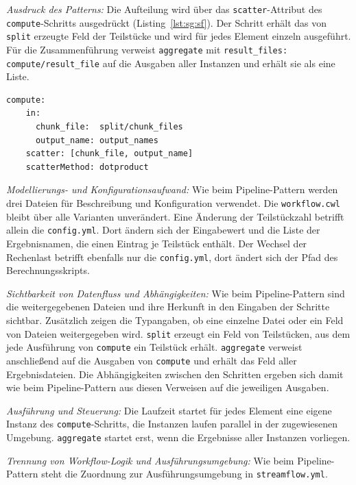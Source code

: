 \emph{Ausdruck des Patterns:} Die Aufteilung wird über das
\texttt{scatter}-Attribut des \texttt{compute}-Schritts ausgedrückt (Listing~\ref{lst:sg:sf}).
Der Schritt erhält das von \texttt{split} erzeugte Feld der
Teilstücke und wird für jedes Element einzeln ausgeführt.
Für die Zusammenführung verweist \texttt{aggregate} mit
\texttt{result\_files: compute/result\_file} auf die Ausgaben aller
Instanzen und erhält sie als eine Liste.

\begin{lstlisting}[caption={Fan-out über scatter am compute-Schritt (StreamFlow, Scatter-Gather)},label={lst:sg:sf}]
  compute:
    in:
      chunk_file:  split/chunk_files
      output_name: output_names
    scatter: [chunk_file, output_name]
    scatterMethod: dotproduct
\end{lstlisting}

\emph{Modellierungs- und Konfigurationsaufwand:} Wie beim
Pipeline-Pattern werden drei Dateien für Beschreibung und
Konfiguration verwendet. Die \texttt{workflow.cwl} bleibt über alle
Varianten unverändert. Eine Änderung der Teilstückzahl betrifft allein
die \texttt{config.yml}. Dort ändern sich der Eingabewert und die
Liste der Ergebnisnamen, die einen Eintrag je Teilstück enthält. Der
Wechsel der Rechenlast betrifft ebenfalls nur die
\texttt{config.yml}, dort ändert sich der Pfad des
Berechnungsskripts.

\emph{Sichtbarkeit von Datenfluss und Abhängigkeiten:} Wie beim
Pipeline-Pattern sind die weitergegebenen Dateien und ihre Herkunft
in den Eingaben der Schritte sichtbar. Zusätzlich zeigen die
Typangaben, ob eine einzelne Datei oder ein Feld von Dateien
weitergegeben wird. \texttt{split} erzeugt ein Feld von Teilstücken,
aus dem jede Ausführung von \texttt{compute} ein Teilstück erhält.
\texttt{aggregate} verweist anschließend auf die Ausgaben von
\texttt{compute} und erhält das Feld aller Ergebnisdateien. Die
Abhängigkeiten zwischen den Schritten ergeben sich damit wie beim
Pipeline-Pattern aus diesen Verweisen auf die jeweiligen Ausgaben.

\emph{Ausführung und Steuerung:} Die Laufzeit startet für jedes
Element eine eigene Instanz des \texttt{compute}-Schritts, die
Instanzen laufen parallel in der zugewiesenen Umgebung.
\texttt{aggregate} startet erst, wenn die Ergebnisse aller Instanzen
vorliegen.

\emph{Trennung von Workflow-Logik und Ausführungsumgebung:} Wie beim
Pipeline-Pattern steht die Zuordnung zur Ausführungsumgebung in
\texttt{streamflow.yml}.


